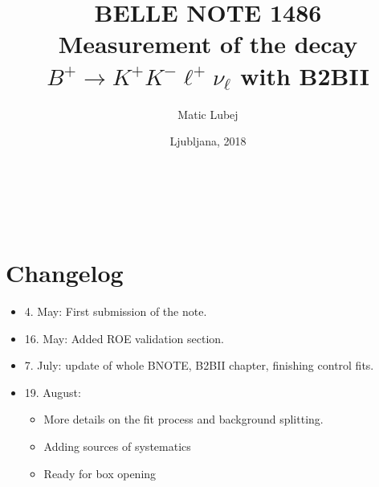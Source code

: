 \documentclass[headings=standardclasses,headings=big,oneside,a4paper,openany,12pt]{scrbook}
\title{{\Large BELLE NOTE 1486}\\\huge {Measurement of the decay $B^+ \to K^+K^-\ell^+\nu_\ell$ with B2BII}}
\author{Matic Lubej}
\date{Ljubljana, 2018}
\begin{document}
\begin{titlingpage} %
\phantom{test}
\vspace{5cm}

\begin{center}
\thetitle
\vspace{0.5 cm} \\
{\Large \theauthor}\\
\vfill
{\Large\thedate}
\end{center}
\end{titlingpage}

\pagestyle{plain}

\chapter*{Changelog}

\begin{itemize}
\item 4. May: First submission of the note.
\item 16. May: Added ROE validation section.
\item 7. July: update of whole BNOTE, B2BII chapter, finishing control fits.
\item 19. August:
	\begin{itemize}
		\item More details on the fit process and background splitting.
		\item Adding sources of systematics
		\item Ready for box opening
	\end{itemize}
\end{itemize}

\tableofcontents
{}










\printbibliography


\end{document}
